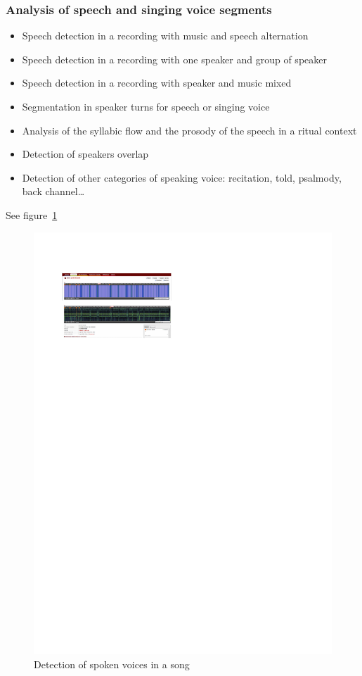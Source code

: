 \documentclass{sig-alternate}
\begin{document}
\subsubsection{Analysis of speech and singing voice segments}
\begin{itemize}
\item Speech detection in a recording with music and speech
  alternation
\item Speech detection in a recording with one speaker and group of
  speaker
\item Speech detection in a recording with speaker and music mixed
\item Segmentation in speaker turns for speech or singing voice
\item Analysis of the syllabic flow and the prosody of the speech in a
  ritual context
\item Detection of speakers overlap
\item Detection of other categories of speaking voice: recitation,
  told, psalmody, back channel…
\end{itemize}
See figure~\ref{fig:speech_detection}
\begin{figure}[htb]
  \centering
 \includegraphics[width=\linewidth]{img/IRIT_Speech4Hz.pdf} 
  \caption{Detection of spoken voices in a song}
  \label{fig:speech_detection}
\end{figure}
\end{document}

